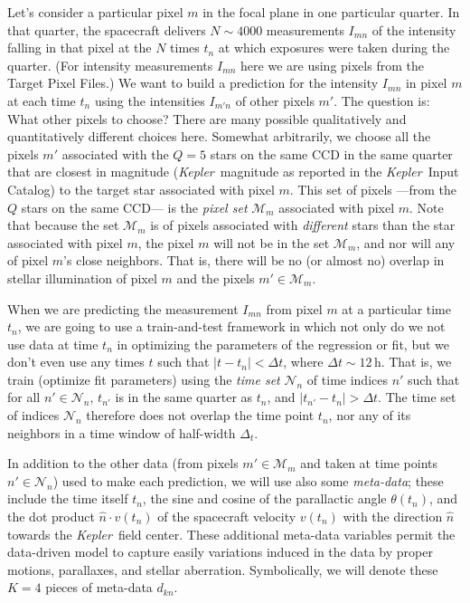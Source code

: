 \documentclass[12pt, preprint]{aastex}
\newcommand{\project}[1]{\textsl{#1}}
\newcommand{\Kepler}{\project{Kepler}}
\newcommand{\set}[1]{\mathcal{#1}}
\begin{document}
Let's consider a particular pixel $m$ in the focal plane in one particular quarter.
In that quarter, the spacecraft delivers $N\sim 4000$ measurements $I_{mn}$
  of the intensity falling in that pixel at the $N$ times $t_n$ at which exposures were taken during the quarter.
(For intensity measurements $I_{mn}$ here we are using pixels from the Target Pixel Files.)
We want to build a prediction for the intensity $I_{mn}$ in pixel $m$ at each time $t_n$
  using the intensities $I_{m'n}$ of other pixels $m'$.
The question is:  What other pixels to choose?
There are many possible qualitatively and quantitatively different choices here.
Somewhat arbitrarily,
  we choose all the pixels $m'$ associated with the $Q=5$ stars on the same CCD in the same quarter
  that are closest in magnitude
  (\Kepler\ magnitude as reported in the \Kepler\ Input Catalog)
  to the target star associated with pixel $m$.
This set of pixels%
  ---from the $Q$ stars on the same CCD---%
  is the \emph{pixel set} $\set{M}_m$ associated with pixel $m$.
Note that because the set $\set{M}_m$ is of pixels associated with \emph{different} stars
  than the star associated with pixel $m$,
  the pixel $m$ will not be in the set $\set{M}_m$,
  and nor will any of pixel $m$'s close neighbors.
That is, there will be no (or almost no) overlap in stellar illumination of pixel $m$
  and the pixels $m'\in\set{M}_m$.

When we are predicting the measurement $I_{mn}$ from pixel $m$ at a particular time $t_n$,
  we are going to use a train-and-test framework in which not only do we not use
  data at time $t_n$ in optimizing the parameters of the regression or fit,
  but we don't even use any times $t$ such that $|t-t_n| < \Delta t$,
  where $\Delta t\sim 12$\,h.
That is, we train (optimize fit parameters) using the \emph{time set} $\set{N}_n$ of time
  indices $n'$ such that for all $n'\in\set{N}_n$,
  $t_{n'}$ is in the same quarter as $t_n$,
  and $|t_{n'} - t_n|>\Delta t$.
The time set of indices $\set{N}_n$ therefore does not overlap the time point $t_n$,
  nor any of its neighbors in a time window of half-width $\Delta_t$.

In addition to the other data (from pixels $m'\in\set{M}_m$ and taken at time points $n'\in\set{N}_n$)
  used to make each prediction, we will use also some \emph{meta-data};
  these include the time itself $t_n$,
  the sine and cosine of the parallactic angle $\theta(t_n)$,
  and the dot product $\hat{n}\cdot v(t_n)$ of the spacecraft velocity $v(t_n)$
  with the direction $\hat{n}$ towards the \Kepler\ field center.
These additional meta-data variables permit the data-driven model
  to capture easily variations induced in the data
  by proper motions, parallaxes, and stellar aberration.
Symbolically, we will denote these $K=4$ pieces of meta-data $d_{kn}$.
\end{document}
